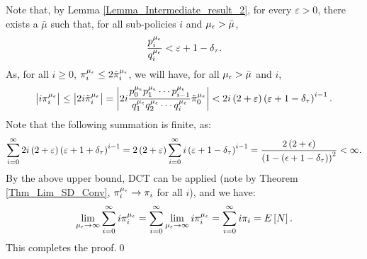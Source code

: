 Note that, by Lemma \ref{Lemma_Intermediate_result_2}, for every $\varepsilon >0$, there exists a $\bar{\mu}$ such that, for all sub-policies $i$ and ${\mu_\epsilon} > \bar{\mu}$,  
		$$
	\frac{p_i^{\mu_\epsilon}}{q_i^{\mu_\epsilon}} <  \varepsilon +  1-\delta_{\tau}.
	$$
As, for all $i \geq 0$, $\pi_i^{\mu_\epsilon} \leq 2 \tilde{\pi}_i^{\mu_\epsilon}$, we will have, for all ${\mu_\epsilon} > \bar{\mu}$ and $i$,
$$
\big|i \pi_i^\mue \big|
%
\leq 	\big|2 i \tilde{\pi}_i^\mue \big|
%
= \bigg| 2  i \frac{p_0^{\mu_\epsilon} p_1^{\mu_\epsilon} \cdots p_{i-1}^{\mu_\epsilon}}{q_1^{\mu_\epsilon} q_2^{\mu_\epsilon} \cdots q_i^{\mu_\epsilon}} \tilde{\pi}_0^\mue \bigg|
%
< 2 i \left(2 + \varepsilon \right) \left(  \varepsilon +  1-\delta_\t \right) ^{i-1}.
$$
	Note that the following summation is finite, as:
	\begin{equation}
	\sum_{i = 0}^{\infty} 2 i \left(2 + \varepsilon \right) \left( \varepsilon + 1 + \delta_{\tau} \right) ^{i-1} 
	= 2 \left(2 + \varepsilon \right) \sum_{i = 0}^{\infty} i \left( \varepsilon + 1 - \delta_{\tau} \right) ^{i-1}
	=  \frac{2 \left(2 + \epsilon \right) }{\left(  1 - \left(\epsilon + 1 - \delta_{\tau} \right)   \right)^2} < \infty \label{Eqn_up}.
	\end{equation}
	By the  above upper bound, DCT   can be applied   (note by Theorem \ref{Thm_Lim_SD_Conv},  $\pi_i^{\mu_{ \epsilon }} \to \pi_i$ for all $i$),  and   we have:
	\begin{eqnarray}
	\lim\limits_{\mue \to \infty}  \sum_{i = 0}^{\infty} i {\pi}_i^\mue 
%
=  \sum_{i = 0}^{\infty}  \lim\limits_{\mue \to \infty} i {\pi}_i^\mue
% 
= \sum_{i=0}^{\infty}  i {\pi}_i = \Exp{N} \nonumber.
	\end{eqnarray}	
This completes the proof.\qed